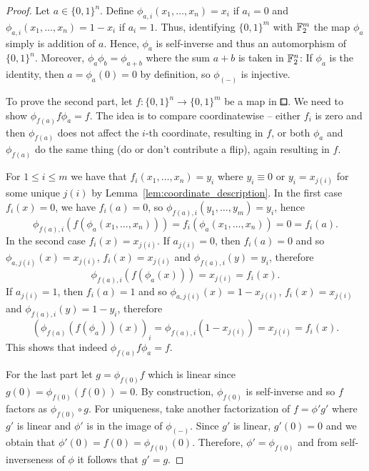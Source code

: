 \begin{proof}
Let $a\in\{0,1\}^n$.
Define $\phi_{a,i}(x_1,\ldots,x_n) = x_i$ if $a_i = 0$ and $\phi_{a,i}(x_1,\ldots,x_n) = 1-x_i$ if $a_i = 1$.
Thus, identifying $\{0,1\}^m$ with $\mathbb{F}_2^m$ the map $\phi_a$ simply is addition of $a$.
Hence, $\phi_a$ is self-inverse and thus an automorphism of $\{0,1\}^n$.
Moreover, $\phi_a\phi_b = \phi_{a+b}$ where the sum $a+b$ is taken in $\mathbb{F}_2^n$:
If $\phi_a$ is the identity, then $a = \phi_a(0) = 0$ by definition, so $\phi_{(-)}$ is injective.


To prove the second part, let $f\colon\{0,1\}^n\to\{0,1\}^m$ be a map in $\bblox$.
We need to show $\phi_{f(a)}f\phi_a = f$.
The idea is to compare coordinatewise -- either $f_i$ is zero and then $\phi_{f(a)}$ does not affect the $i$-th coordinate, resulting in $f$,
or both $\phi_a$ and $\phi_{f(a)}$ do the same thing (do or don't contribute a flip),
again resulting in $f$.

For $1\leq i\leq m$ we have that $f_i(x_1,\ldots,x_n) = y_i$ where $y_i \equiv 0$ or $y_i = x_{j(i)}$ for some unique $j(i)$ by Lemma~\ref{lem:coordinate_description}.
In the first case $f_i(x) = 0$, we have $f_i(a) = 0$, so $\phi_{f(a),i}(y_1,\ldots,y_m) = y_i$, hence
\[
    \phi_{f(a),i}(f(\phi_a(x_1,\ldots,x_n)))=f_i(\phi_a(x_1,\ldots,x_n)) = 0=f_i(a).
\]
In the second case $f_i(x) = x_{j(i)}$.
If $a_{j(i)}=0$, then $f_i(a)=0$ and so $\phi_{a,j(i)}(x)=x_{j(i)}$,
$f_i(x)= x_{j(i)}$ and $\phi_{f(a),i}(y) = y_i$, therefore
\[
    \phi_{f(a),i}(f(\phi_a(x))) = x_{j(i)} = f_i(x).
\]
If $a_{j(i)}=1$, then $f_i(a)=1$ and so $\phi_{a, j(i)}(x)=1-x_{j(i)}$,
$f_i(x)=x_{j(i)}$ and $\phi_{f(a),i}(y) = 1-y_i$, therefore
\[
    (\phi_{f(a)}(f(\phi_a))(x))_i = \phi_{f(a),i}(1-x_{j(i)}) = x_{j(i)} = f_i(x).
\]
This shows that indeed $\phi_{f(a)}f\phi_a = f$.

For the last part let $g = \phi_{f(0)}f$ which is linear since $g(0) = \phi_{f(0)}(f(0)) = 0$.
By construction, $\phi_{f(0)}$ is self-inverse and so $f$ factors as $\phi_{f(0)}\circ g$.
For uniqueness, take another factorization of $f = \phi'g'$ where $g'$ is linear and $\phi'$ is in the image of $\phi_{(-)}$.
Since $g'$ is linear, $g'(0)=0$ and we obtain that $\phi'(0) = f(0) = \phi_{f(0)}(0)$.
Therefore, $\phi'=\phi_{f(0)}$ and from self-inverseness of $\phi$ it follows that $g' = g$.
\end{proof}

